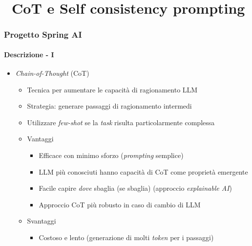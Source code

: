 \section{\faWrench\ CoT e Self consistency prompting} %
\label{sec:spring-ai-gemini-cot-self-consistency-prompting}
%
\begin{frame}[t,fragile] \frametitle{Progetto Spring AI}
    \framesubtitle{Descrizione - I}
    {\small
        \begin{itemize}[leftmargin=10pt,align=right]
            \item[\alertedcircled{1}] \textit{Chain-of-Thought} (CoT)
            \begin{itemize}[leftmargin=10pt,align=right]
                \item[\alert{\faArrowCircleRight}] Tecnica per aumentare le capacità di ragionamento LLM
                \item[\alert{\faArrowCircleRight}] Strategia: generare \alert{passaggi di ragionamento intermedi}
                \item[\alert{\faExclamationTriangle}] Utilizzare \textit{few-shot} se la \textit{task} risulta particolarmente complessa
                \item[\alert{\faArrowCircleRight}] Vantaggi
                \begin{itemize}[leftmargin=10pt,align=right]
                    \item[\alert{\faArrowCircleRight}] Efficace con minimo sforzo (\textit{prompting} semplice)
                    \item[\alert{\faArrowCircleRight}] LLM più conosciuti hanno capacità di CoT come proprietà emergente
                    \item[\alert{\faArrowCircleRight}] Facile capire \textit{dove} sbaglia (se sbaglia) (approccio \textit{explainable AI})
                    \item[\alert{\faArrowCircleRight}] Approccio CoT più robusto in caso di cambio di LLM
                \end{itemize}
                \item[\alert{\faArrowCircleRight}] Svantaggi
                \begin{itemize}[leftmargin=10pt,align=right]
                    \item[\alert{\faArrowCircleRight}] Costoso e lento (generazione di molti \textit{token} per i passaggi)
                \end{itemize}               
            \end{itemize}
        \end{itemize}
    }
\end{frame}
